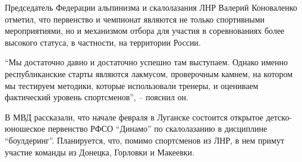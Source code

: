 Председатель Федерации альпинизма и скалолазания ЛНР Валерий Коноваленко
отметил, что первенство и чемпионат являются не только спортивными
мероприятиями, но и механизмом отбора для участия в соревнованиях более
высокого статуса, в частности, на территории России.

\enquote{Мы достаточно давно и достаточно успешно там выступаем. Однако именно
республиканские старты являются лакмусом, проверочным камнем, на котором мы
тестируем методики, которые использовали тренеры, и оцениваем фактический
уровень спортсменов}, – пояснил он.

В МВД рассказали, что начале февраля в Луганске состоится открытое
детско-юношеское первенство РФСО \enquote{Динамо} по скалолазанию в дисциплине
\enquote{боулдеринг}. Планируется, что, помимо спортсменов из ЛНР, в нем примут участие
команды из Донецка, Горловки и Макеевки.

